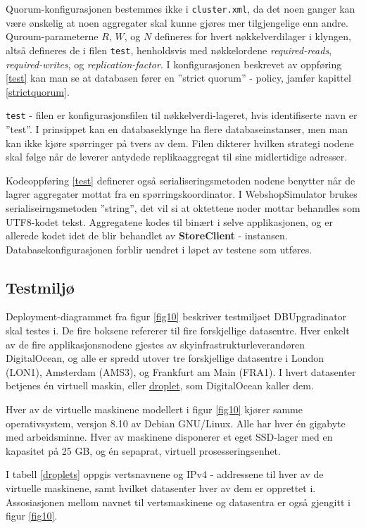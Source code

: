 

Quorum-konfigurasjonen bestemmes ikke i \texttt{cluster.xml}, da det noen ganger kan være ønskelig at noen aggregater skal kunne gjøres mer tilgjengelige enn andre. Quroum-parameterne \(R\), \(W\), og \(N\) defineres for hvert nøkkelverdi\-lager i klyngen, altså defineres de i filen \texttt{test}, henholdsvis med nøkkelordene \emph{required-reads}, \emph{required-writes}, og \emph{replication-factor}. I konfigurasjonen beskrevet av oppføring \ref{test} kan man se at databasen fører en ''strict quorum'' - policy, jamfør kapittel \ref{strictquorum}.

\texttt{test} - filen er konfigurasjonsfilen til nøkkelverdi-lageret, hvis identifiserte navn er ''test''.  I prinsippet kan en databaseklynge ha flere databaseinstanser, men man kan ikke kjøre spørringer på tvers av dem. Filen dikterer hvilken strategi nodene skal følge når de leverer antydede replika\-aggregat til sine midlertidige adresser.

Kodeoppføring \ref{test} definerer også serialiseringsmetoden nodene benytter når de lagrer aggregater mottat fra en spørringskoordinator. I WebshopSimulator brukes serialiseirngs\-metoden ''string'', det vil si at oktettene noder mottar behandles som UTF8-kodet tekst. Aggregatene kodes til binært i selve applikasjonen, og er allerede kodet idet de blir behandlet av \textbf{StoreClient} - instansen. Databasekonfigurasjonen forblir uendret i løpet av testene som utføres.

\subsection{Testmiljø}

Deployment-diagrammet fra figur \ref{fig10} beskriver testmiljøet DBUpgradinator skal testes i. De fire boksene refererer til fire forskjellige datasentre. Hver enkelt av de fire applikasjonsnodene gjestes av skyinfrastrukturleverandøren DigitalOcean, og alle er spredd utover tre forskjellige datasentre i London (LON1), Amsterdam (AMS3), og Frankfurt am Main (FRA1). I hvert datasenter betjenes én virtuell maskin, eller \underline{droplet}, som DigitalOcean kaller dem.

Hver av de virtuelle maskinene modellert i figur \ref{fig10} kjører samme operativsystem, versjon 8.10 av Debian GNU/Linux. Alle har hver én gigabyte med arbeidsminne. Hver av maskinene disponerer et eget SSD-lager med en kapasitet på 25 GB, og én sepaprat, virtuell prosesseringsenhet.



I tabell \ref{droplets} oppgis vertsnavnene og IPv4 - addressene til hver av de virtuelle maskinene, samt hvilket datasenter hver av dem er opprettet i. Assosiasjonen mellom navnet til vertsmaskinene og datasentra er også gjengitt i figur \ref{fig10}.

